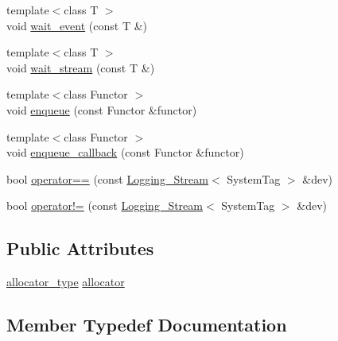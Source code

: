 \begin{DoxyCompactItemize}
{\footnotesize template$<$class T $>$ }\\void \hyperlink{structbc_1_1streams_1_1Logging__Stream_acffaf62d148bb839bb2700351cf8ce66}{wait\+\_\+event} (const T \&)
\item 
{\footnotesize template$<$class T $>$ }\\void \hyperlink{structbc_1_1streams_1_1Logging__Stream_ad42d7d3cc4c947190335dbea13e80fe2}{wait\+\_\+stream} (const T \&)
\item 
{\footnotesize template$<$class Functor $>$ }\\void \hyperlink{structbc_1_1streams_1_1Logging__Stream_a02f3be7b4c71e932a6b948680bf22f35}{enqueue} (const Functor \&functor)
\item 
{\footnotesize template$<$class Functor $>$ }\\void \hyperlink{structbc_1_1streams_1_1Logging__Stream_a3fda59dde0522bc6dc33e340b2e42181}{enqueue\+\_\+callback} (const Functor \&functor)
\item 
bool \hyperlink{structbc_1_1streams_1_1Logging__Stream_a5c6ac3d7be471ef30364664944c7f689}{operator==} (const \hyperlink{structbc_1_1streams_1_1Logging__Stream}{Logging\+\_\+\+Stream}$<$ System\+Tag $>$ \&dev)
\item 
bool \hyperlink{structbc_1_1streams_1_1Logging__Stream_a37020a107e60ec7a684eaacd099b4aca}{operator!=} (const \hyperlink{structbc_1_1streams_1_1Logging__Stream}{Logging\+\_\+\+Stream}$<$ System\+Tag $>$ \&dev)
\end{DoxyCompactItemize}
\subsection*{Public Attributes}
\begin{DoxyCompactItemize}
\item 
\hyperlink{structbc_1_1streams_1_1Logging__Stream_a8f20249b75af292f8b50c8bb09a82b38}{allocator\+\_\+type} \hyperlink{structbc_1_1streams_1_1Logging__Stream_a635c2bdad82fdd1ee9782c761a5c2131}{allocator}
\end{DoxyCompactItemize}


\subsection{Member Typedef Documentation}
\mbox{\label{structbc_1_1streams_1_1Logging__Stream_a8f20249b75af292f8b50c8bb09a82b38}} 
